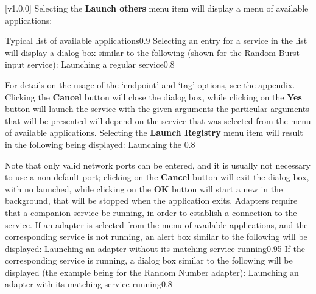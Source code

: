 [v1.0.0]
Selecting the \textbf{Launch others \textellipsis} menu item will display a menu of
available applications:

%
{Typical list of available applications}{0.9}
\condPage{}
Selecting an entry for a service in the list will display a dialog box similar to the
following (shown for the Random Burst input service):
%
{Launching a regular service}{0.8}

For details on the usage of the `endpoint' and `tag' options, see the 
 appendix.
Clicking the \textbf{Cancel} button will close the dialog box, while clicking on the
\textbf{Yes} button will launch the service with the given arguments \longDash{} the
particular arguments that will be presented will depend on the service that was selected
from the menu of available applications.
\secondaryEnd
\condPage
{}
Selecting the \textbf{Launch Registry} menu item will result in the following being
displayed:
%
{Launching the \emph{\RS}}{0.8}

Note that only valid network ports can be entered, and it is usually not necessary to use
a non-default port; clicking on the \textbf{Cancel} button will exit the dialog box, with
no \emph{\RS} launched, while clicking on the \textbf{OK} button will start a new
\emph{\RS} in the background, that will be stopped when the \emph{\MMMU} application
exits.
\secondaryEnd
{}
Adapters require that a companion service be running, in order to establish a connection
to the service.
If an adapter is selected from the menu of available applications, and the corresponding
service is not running, an alert box similar to the following will be displayed:
%
{Launching an adapter without its matching service running}{0.95}
\condPage{}
If the corresponding service is running, a dialog box similar to the following will be
displayed (the example being for the Random Number adapter):
%
{Launching an adapter with its matching service running}{0.8}

